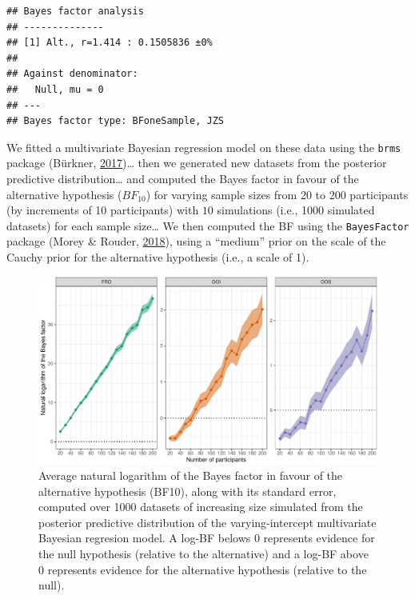 \documentclass[
  english,
  man,floatsintext]{apa6}
\begin{document}
\begin{verbatim}
## Bayes factor analysis
## --------------
## [1] Alt., r=1.414 : 0.1505836 ±0%
## 
## Against denominator:
##   Null, mu = 0 
## ---
## Bayes factor type: BFoneSample, JZS
\end{verbatim}

We fitted a multivariate Bayesian regression model on these data using the \texttt{brms} package (Bürkner, \protect\hyperlink{ref-R-brms}{2017})\ldots{} then we generated new datasets from the posterior predictive distribution\ldots{} and computed the Bayes factor in favour of the alternative hypothesis (\(BF_{10}\)) for varying sample sizes from 20 to 200 participants (by increments of 10 participants) with \(10\) simulations (i.e., 1000 simulated datasets) for each sample size\ldots{} We then computed the BF using the \texttt{BayesFactor} package (Morey \& Rouder, \protect\hyperlink{ref-R-BayesFactor}{2018}), using a ``medium'' prior on the scale of the Cauchy prior for the alternative hypothesis (i.e., a scale of 1).

\begin{figure}[!htb]

{\centering \includegraphics[width=1\linewidth]{reanalysis_files/figure-latex/simulated-power-1} 

}

\caption{Average natural logarithm of the Bayes factor in favour of the alternative hypothesis (BF10), along with its standard error, computed over 1000 datasets of increasing size simulated from the posterior predictive distribution of the varying-intercept multivariate Bayesian regresion model. A log-BF belows 0 represents evidence for the null hypothesis (relative to the alternative) and a log-BF above 0 represents evidence for the alternative hypothesis (relative to the null).}\label{fig:simulated-power}
\end{figure}
\end{document}

